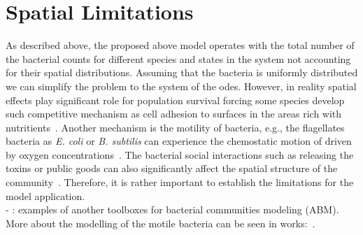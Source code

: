 \documentclass[10pt,A4paper]{article}
\begin{document}
\section{Spatial Limitations}
As described above, the proposed above model operates with the total number of the bacterial counts for different species and states in the system not accounting for their spatial distributions.
Assuming that the bacteria is uniformly distributed we can simplify the problem to the system of the \acp{ode}.
However, in reality spatial effects play significant role for population survival forcing some species develop such competitive mechanism as cell adhesion to surfaces in the areas rich with nutritients~\cite{htuson_bacteriasurface_2013}.
Another mechanism is the motility of bacteria, e.g., the flagellates bacteria as \textit{E. coli} or \textit{B. subtilis} can experience the chemostatic motion of driven by oxygen concentrations~\cite{decoene_microscopic_2011}.
The bacterial social interactions such as releasing the toxins or public goods can also significantly affect the spatial structure of the community~\cite{blanchard_bacterial_2015}.
Therefore, it is rather important to establish the limitations for the model application.\\

- \cite{emonet_agentcell_2005, gorochowski_bsim_2012, li_nufeb_2019, kreft_bacsim_1998}: examples of another toolboxes for bacterial communities modeling (ABM).\\
More about the modelling of the motile bacteria can be seen in works:~\cite{decoene_microscopic_2011, rosser_modelling_2014, sokolov_physical_2012, li_amplified_2008}.
\end{document}
